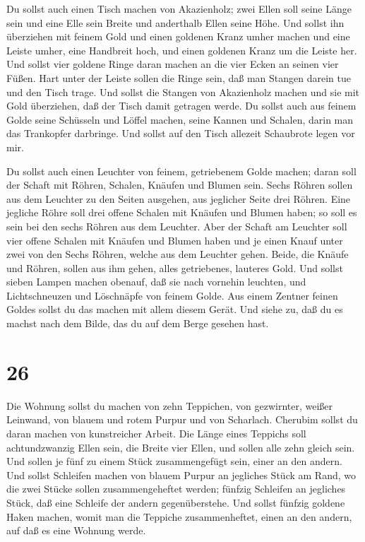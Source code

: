  Du sollst auch einen Tisch machen von Akazienholz; zwei
Ellen soll seine Länge sein und eine Elle sein Breite und anderthalb
Ellen seine Höhe.  Und sollst ihn überziehen mit feinem
Gold und einen goldenen Kranz umher machen  und eine Leiste
umher, eine Handbreit hoch, und einen goldenen Kranz um die Leiste her.
 Und sollst vier goldene Ringe daran machen an die vier
Ecken an seinen vier Füßen.  Hart unter der Leiste sollen
die Ringe sein, daß man Stangen darein tue und den Tisch trage.
 Und sollst die Stangen von Akazienholz machen und sie mit
Gold überziehen, daß der Tisch damit getragen werde.  Du
sollst auch aus feinem Golde seine Schüsseln und Löffel machen, seine
Kannen und Schalen, darin man das Trankopfer darbringe. 
Und sollst auf den Tisch allezeit Schaubrote legen vor mir.

 Du sollst auch einen Leuchter von feinem, getriebenem
Golde machen; daran soll der Schaft mit Röhren, Schalen, Knäufen und
Blumen sein.  Sechs Röhren sollen aus dem Leuchter zu den
Seiten ausgehen, aus jeglicher Seite drei Röhren.  Eine
jegliche Röhre soll drei offene Schalen mit Knäufen und Blumen haben; so
soll es sein bei den sechs Röhren aus dem Leuchter.  Aber
der Schaft am Leuchter soll vier offene Schalen mit Knäufen und Blumen
haben  und je einen Knauf unter zwei von den Sechs Röhren,
welche aus dem Leuchter gehen.  Beide, die Knäufe und
Röhren, sollen aus ihm gehen, alles getriebenes, lauteres Gold.
 Und sollst sieben Lampen machen obenauf, daß sie nach
vornehin leuchten,  und Lichtschneuzen und Löschnäpfe von
feinem Golde.  Aus einem Zentner feinen Goldes sollst du
das machen mit allem diesem Gerät.  Und siehe zu, daß du es
machst nach dem Bilde, das du auf dem Berge gesehen hast.

\hypertarget{section-25}{%
\section{26}\label{section-25}}

 Die Wohnung sollst du machen von zehn Teppichen, von
gezwirnter, weißer Leinwand, von blauem und rotem Purpur und von
Scharlach. Cherubim sollst du daran machen von kunstreicher Arbeit.
 Die Länge eines Teppichs soll achtundzwanzig Ellen sein,
die Breite vier Ellen, und sollen alle zehn gleich sein. 
Und sollen je fünf zu einem Stück zusammengefügt sein, einer an den
andern.  Und sollst Schleifen machen von blauem Purpur an
jegliches Stück am Rand, wo die zwei Stücke sollen zusammengeheftet
werden;  fünfzig Schleifen an jegliches Stück, daß eine
Schleife der andern gegenüberstehe.  Und sollst fünfzig
goldene Haken machen, womit man die Teppiche zusammenheftet, einen an
den andern, auf daß es eine Wohnung werde.

